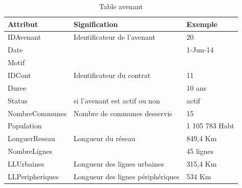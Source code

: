 \documentclass[a4paper]{report}
\begin{document}
\begin{doublespace}
	\begin{table}[H]
		\begin{center}
			\begin{tabularx}{17.5cm}{|X|X|X|}
				\hline
				\textbf{Attribut} & \textbf{Signification}            &
				\textbf{Exemple}                                                       \\
				\hline
				IDAvenant         & Identificateur de l'avenant       & 20             \\
				\hline
				Date              &                                   & 1-Jun-14       \\
				\hline
				Motif             &                                   &                \\
				\hline
				IDCont            & Identificateur du contrat         & 11             \\
				\hline
				Duree             &                                   & 10 ans         \\
				\hline
				Status            & si l’avenant est actif ou non     & actif          \\
				\hline
				NombreCommunes    & Nombre de communes desservis      & 15             \\
				\hline
				Population        &                                   & 1 105 783 Habt \\
				\hline
				LonguerReseau     & Longueur du réseau                & 849,4 Km       \\
				\hline
				NombreLignes      &                                   & 45 lignes      \\
				\hline
				LLUrbaines        & Longueur des lignes urbaines      & 315,4 Km       \\
				\hline
				LLPeripheriques   & Longueur des lignes périphériques & 534
				Km                                                                     \\
				\hline
			\end{tabularx}
			\caption{Table avenant}
		\end{center}
	\end{table}


\end{doublespace}
\end{document}

